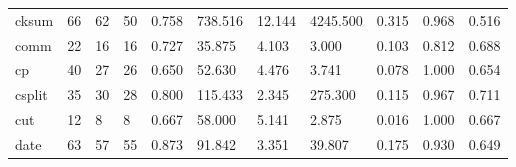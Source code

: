 \begin{longtable}{lp{1.8cm}p{1.8cm}p{1.8cm}p{1.8cm}p{1.8cm}p{1.8cm}p{1.8cm}p{1.8cm}p{1.8cm}p{1.8cm}}
cksum     &                           66 &                 62 &                                50 &                                      0.758 &                                738.516 &                                       12.144 &                          4245.500 &                                   0.315 &                              0.968 &                                              0.516 \\
comm      &                           22 &                 16 &                                16 &                                      0.727 &                                 35.875 &                                        4.103 &                             3.000 &                                   0.103 &                              0.812 &                                              0.688 \\
cp        &                           40 &                 27 &                                26 &                                      0.650 &                                 52.630 &                                        4.476 &                             3.741 &                                   0.078 &                              1.000 &                                              0.654 \\
csplit    &                           35 &                 30 &                                28 &                                      0.800 &                                115.433 &                                        2.345 &                           275.300 &                                   0.115 &                              0.967 &                                              0.711 \\
cut       &                           12 &                  8 &                                 8 &                                      0.667 &                                 58.000 &                                        5.141 &                             2.875 &                                   0.016 &                              1.000 &                                              0.667 \\
date      &                           63 &                 57 &                                55 &                                      0.873 &                                 91.842 &                                        3.351 &                            39.807 &                                   0.175 &                              0.930 &                                              0.649 \\

\end{longtable}
